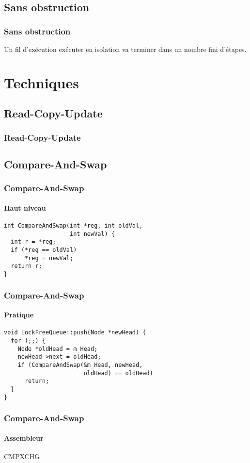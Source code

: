\documentclass{beamer}
\begin{document}

\subsection{Sans obstruction}
\begin{frame}[fragile]
\frametitle{Sans obstruction}
Un fil d'exécution exécuter en isolation va terminer dans un nombre fini d'étapes.

\end{frame}

\section{Techniques}
\subsection{Read-Copy-Update}
\begin{frame}
\frametitle{Read-Copy-Update}
\end{frame}

\subsection{Compare-And-Swap}
\begin{frame}[fragile]
\frametitle{Compare-And-Swap}
\framesubtitle{Haut niveau}
\begin{lstlisting}
int CompareAndSwap(int *reg, int oldVal,
                   int newVal) {
  int r = *reg;
  if (*reg == oldVal)
      *reg = newVal;
  return r;
}
\end{lstlisting}
\end{frame}

\begin{frame}[fragile]
\frametitle{Compare-And-Swap}
\framesubtitle{Pratique}
\begin{lstlisting}
void LockFreeQueue::push(Node *newHead) {
  for (;;) {
    Node *oldHead = m_Head;
    newHead->next = oldHead;
    if (CompareAndSwap(&m_Head, newHead, 
                       oldHead) == oldHead)
      return;
  }
}
\end{lstlisting}
\end{frame}

\begin{frame}[fragile]
\frametitle{Compare-And-Swap}
\framesubtitle{Assembleur}
\begin{center}
\Huge CMPXCHG
\end{center}
\end{frame}
\end{document}
